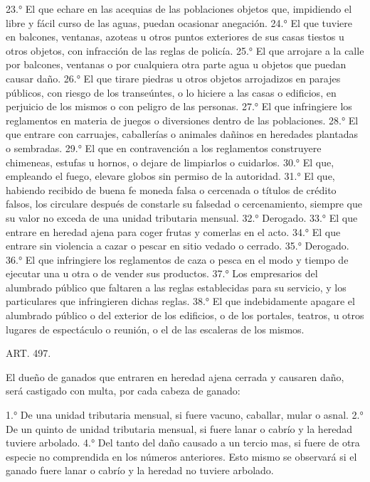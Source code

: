     23.° El que echare en las acequias de las poblaciones objetos que, impidiendo el libre y fácil curso de las aguas, puedan ocasionar anegación.
    24.° El que tuviere en balcones, ventanas, azoteas u otros puntos exteriores de sus casas tiestos u otros objetos, con infracción de las reglas de policía.
    25.° El que arrojare a la calle por balcones, ventanas o por cualquiera otra parte agua u objetos que puedan causar daño.
    26.° El que tirare piedras u otros objetos arrojadizos en parajes públicos, con riesgo de los transeúntes, o lo hiciere a las casas o edificios, en perjuicio de los mismos o con peligro de las personas.
    27.° El que infringiere los reglamentos en materia de juegos o diversiones dentro de las poblaciones.
    28.° El que entrare con carruajes, caballerías o animales dañinos en heredades plantadas o sembradas.
    29.° El que en contravención a los reglamentos construyere chimeneas, estufas u hornos, o dejare de limpiarlos o cuidarlos.
    30.° El que, empleando el fuego, elevare globos sin permiso de la autoridad.
    31.° El que, habiendo recibido de buena fe moneda falsa o cercenada o títulos de crédito falsos, los circulare después de constarle su falsedad o cercenamiento, siempre que su valor no exceda de una unidad tributaria mensual.
    32.° Derogado.
    33.° El que entrare en heredad ajena para coger frutas y comerlas en el acto.
    34.° El que entrare sin violencia a cazar o pescar en sitio vedado o cerrado.
    35.° Derogado.
    36.° El que infringiere los reglamentos de caza o pesca en el modo y tiempo de ejecutar una u otra o de vender sus productos.
    37.° Los empresarios del alumbrado público que faltaren a las reglas establecidas para su servicio, y los particulares que infringieren dichas reglas.
    38.° El que indebidamente apagare el alumbrado público o del exterior de los edificios, o de los portales, teatros, u otros lugares de espectáculo o reunión, o el de las escaleras de los mismos.


    ART. 497.

    El dueño de ganados que entraren en heredad ajena cerrada y causaren daño, será castigado con multa, por cada cabeza de ganado:

    1.° De una unidad tributaria mensual, si fuere vacuno, caballar, mular o asnal.
    2.° De  un quinto de unidad tributaria mensual, si fuere lanar o cabrío y la heredad tuviere arbolado.
    4.° Del tanto del daño causado a un tercio mas, si fuere de otra especie no comprendida en los números anteriores.
    Esto mismo se observará si el ganado fuere lanar o cabrío y la heredad no tuviere arbolado.









